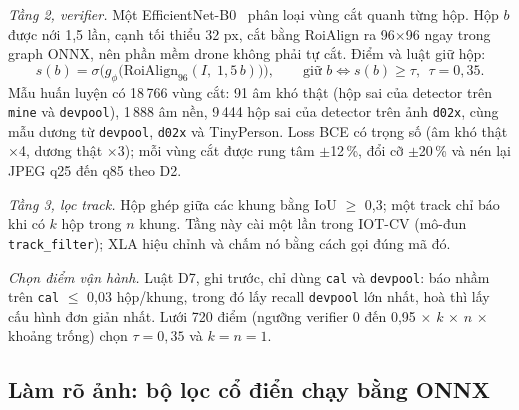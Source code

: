 \textit{Tầng 2, verifier.} Một EfficientNet-B0~\cite{effnet} phân loại vùng cắt quanh từng hộp. Hộp $b$ được nới 1,5 lần, cạnh tối thiểu 32 px, cắt bằng RoiAlign ra 96$\times$96 ngay trong graph ONNX, nên phần mềm drone không phải tự cắt. Điểm và luật giữ hộp:
\begin{equation}
s(b)=\sigma\Big(g_{\phi}\big(\mathrm{RoiAlign}_{96}(I,\;1{,}5\,b)\big)\Big),\qquad \text{giữ } b \iff s(b)\geq\tau,\ \ \tau=0{,}35.
\label{eq:verifier}
\end{equation}
Mẫu huấn luyện có 18\,766 vùng cắt: 91 âm khó thật (hộp sai của detector trên \texttt{mine} và \texttt{devpool}), 1\,888 âm nền, 9\,444 hộp sai của detector trên ảnh \texttt{d02x}, cùng mẫu dương từ \texttt{devpool}, \texttt{d02x} và TinyPerson. Loss BCE có trọng số (âm khó thật $\times$4, dương thật $\times$3); mỗi vùng cắt được rung tâm $\pm$12\,\%, đổi cỡ $\pm$20\,\% và nén lại JPEG q25 đến q85 theo D2.

\textit{Tầng 3, lọc track.} Hộp ghép giữa các khung bằng IoU $\geq$ 0,3; một track chỉ báo khi có $k$ hộp trong $n$ khung. Tầng này cài một lần trong IOT-CV (mô-đun \texttt{track\_filter}); XLA hiệu chỉnh và chấm nó bằng cách gọi đúng mã đó.

\textit{Chọn điểm vận hành.} Luật D7, ghi trước, chỉ dùng \texttt{cal} và \texttt{devpool}: báo nhầm trên \texttt{cal} $\leq$ 0,03 hộp/khung, trong đó lấy recall \texttt{devpool} lớn nhất, hoà thì lấy cấu hình đơn giản nhất. Lưới 720 điểm (ngưỡng verifier 0 đến 0,95 $\times$ $k$ $\times$ $n$ $\times$ khoảng trống) chọn $\tau=0{,}35$ và $k=n=1$.

\subsection{Làm rõ ảnh: bộ lọc cổ điển chạy bằng ONNX}

